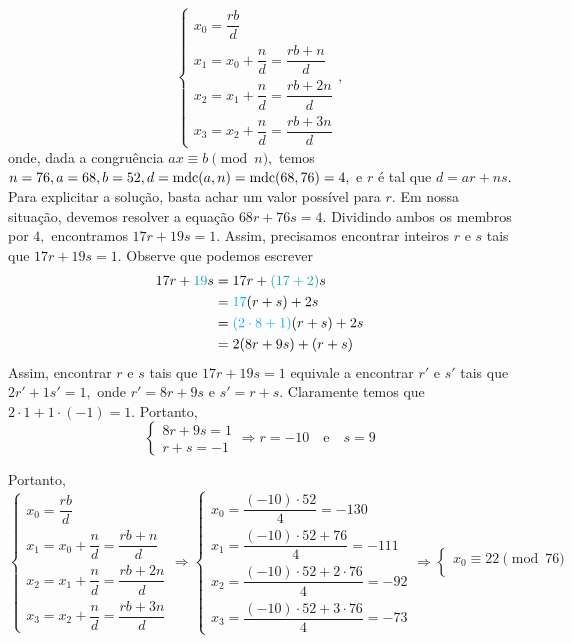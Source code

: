 \documentclass[oneside,a4paper,12pt]{article}
\newcommand{\mdc}{{\rm mdc}}
\theoremstyle{Colorido}
\theoremstyle{solu}
\theoremstyle{dotlessP}
\begin{document}
{\begin{tasks}[counter-format={(tsk[a])},label-width=3.6ex, label-format = {\bfseries}, column-sep = {20pt}]
\[\begin{cases}
x_0 = \dfrac{rb}{d} \\
x_1 = x_0 + \dfrac{n}{d} = \dfrac{rb + n}{d} \\
x_2 = x_1 + \dfrac{n}{d} = \dfrac{rb + 2n}{d} \\
x_3 = x_2 + \dfrac{n}{d} = \dfrac{rb + 3n}{d}
\end{cases},
\]
onde, dada a congruência $ax \equiv b \pmod{n},$ temos $n = 76, a = 68, b = 52, d = \mdc(a,n) = \mdc(68, 76) = 4,$ e $r$ é tal que $d = ar + ns.$ Para explicitar a solução, basta achar um valor possível para $r.$ Em nossa situação, devemos resolver a equação $68r + 76s = 4.$ Dividindo ambos os membros por $4,$ encontramos $17r + 19s = 1.$ Assim, precisamos encontrar inteiros $r$ e $s$ tais que $17r + 19s = 1.$ Observe que podemos escrever
	\begin{align*}
	17r + \textcolor{Emerald}{19}s &= 17r + \textcolor{Emerald}{(17 + 2)}s \\&= \textcolor{Cyan}{17}(r+s) + 2s \\&= \textcolor{Cyan}{(2 \cdot 8 + 1)}(r+s) + 2s \\&= 2(8r+9s) + (r+s) 
	\end{align*}
	Assim, encontrar $r$ e $s$ tais que $17r+19s = 1$ equivale a encontrar $r'$ e $s'$ tais que $2r'+1s' = 1,$ onde $r' = 8r+9s$ e $s' = r+s.$ Claramente temos que $2 \cdot 1 + 1 \cdot (-1) = 1.$ Portanto,
	\[
	\begin{cases}
	8r+9s = 1 \\
	r+s = -1
	\end{cases} \Rightarrow r = -10 \quad \mbox{e} \quad s = 9
	\]
\end{tasks}
Portanto,
\[
\begin{cases}
x_0 = \dfrac{rb}{d} \\
x_1 = x_0 + \dfrac{n}{d} = \dfrac{rb + n}{d} \\
x_2 = x_1 + \dfrac{n}{d} = \dfrac{rb + 2n}{d} \\
x_3 = x_2 + \dfrac{n}{d} = \dfrac{rb + 3n}{d}
\end{cases} \Rightarrow \begin{cases}
x_0 = \dfrac{(-10)\cdot 52}{4} = -130\\
x_1  = \dfrac{(-10) \cdot 52 + 76}{4} = -111 \\
x_2 = \dfrac{(-10) \cdot 52 + 2 \cdot 76}{4} = -92 \\
x_3 = \dfrac{(-10) \cdot 52 + 3 \cdot 76}{4} = -73
\end{cases} \Rightarrow \begin{cases}
x_0 \equiv22 \pmod{76}\\

\end{cases}\]}
\end{document}
